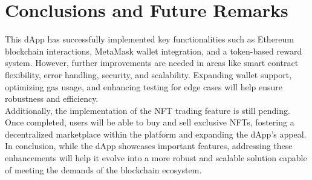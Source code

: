 \documentclass[../main.tex]{subfiles}
\begin{document}
\section{Conclusions and Future Remarks}\label{sec:conclusions}
This dApp has successfully implemented key functionalities such as Ethereum blockchain interactions, MetaMask wallet integration, and a token-based reward system. However, further improvements are needed in areas like smart contract flexibility, error handling, security, and scalability. Expanding wallet support, optimizing gas usage, and enhancing testing for edge cases will help ensure robustness and efficiency.\\

Additionally, the implementation of the NFT trading feature is still pending. Once completed, users will be able to buy and sell exclusive NFTs, fostering a decentralized marketplace within the platform and expanding the dApp's appeal. \\

In conclusion, while the dApp showcases important features, addressing these enhancements will help it evolve into a more robust and scalable solution capable of meeting the demands of the blockchain ecosystem.
\end{document}
